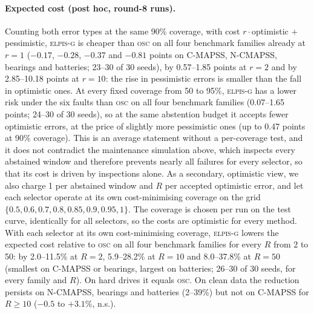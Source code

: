 \documentclass{esannV2}
\newcommand{\OSC}{\textsc{osc}}
\newcommand{\AUTOD}{\textsc{elpis-g}}
\begin{document}
\paragraph{Expected cost (post hoc, round-8 runs).} Counting both error types at the same 90\% coverage, with cost $r\cdot$optimistic $+$ pessimistic, \AUTOD{} is cheaper than \OSC{} on all four benchmark families already at $r=1$ ($-0.17$, $-0.28$, $-0.37$ and $-0.81$ points on C-MAPSS, N-CMAPSS, bearings and batteries; 23--30 of 30 seeds), by 0.57--1.85 points at $r=2$ and by 2.85--10.18 points at $r=10$: the rise in pessimistic errors is smaller than the fall in optimistic ones. At every fixed coverage from 50 to 95\%, \AUTOD{} has a lower risk under the six faults than \OSC{} on all four benchmark families (0.07--1.65 points; 24--30 of 30 seeds), so at the same abstention budget it accepts fewer optimistic errors, at the price of slightly more pessimistic ones (up to 0.47 points at 90\% coverage). This is an average statement without a per-coverage test, and it does not contradict the maintenance simulation above, which inspects every abstained window and therefore prevents nearly all failures for every selector, so that its cost is driven by inspections alone. As a secondary, optimistic view, we also charge 1 per abstained window and $R$ per accepted optimistic error, and let each selector operate at its own cost-minimising coverage on the grid $\{0.5,0.6,0.7,0.8,0.85,0.9,0.95,1\}$. The coverage is chosen per run on the test curve, identically for all selectors, so the costs are optimistic for every method. With each selector at its own cost-minimising coverage, \AUTOD{} lowers the expected cost relative to \OSC{} on all four benchmark families for every $R$ from 2 to 50: by 2.0--11.5\% at $R=2$, 5.9--28.2\% at $R=10$ and 8.0--37.8\% at $R=50$ (smallest on C-MAPSS or bearings, largest on batteries; 26--30 of 30 seeds, for every family and $R$). On hard drives it equals \OSC. On clean data the reduction persists on N-CMAPSS, bearings and batteries (2--39\%) but not on C-MAPSS for $R\ge10$ ($-0.5$ to $+3.1$\%, n.s.).




\FloatBarrier
\end{document}
